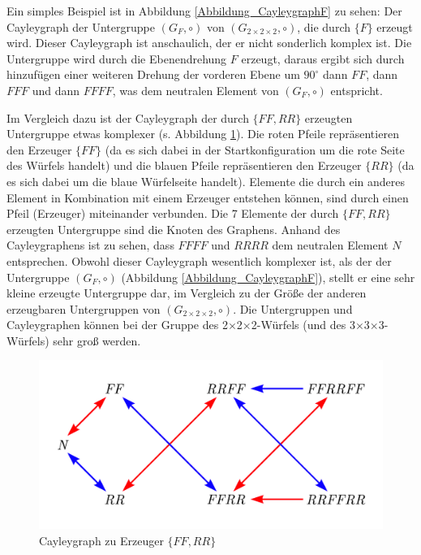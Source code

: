 \documentclass[12pt,a4paper, usenames, dvipsnames]{article}
\theoremstyle{mystyle}
\theoremstyle{definition}
\newcommand{\Gtwo}{\ensuremath{G_{2\times 2\times 2}}}
\newcommand{\Ttwo}{2$\times$2$\times$2-}
\newcommand{\Tthree}{3$\times$3$\times$3-}
\begin{document}
Ein simples Beispiel ist in Abbildung \ref{Abbildung_CayleygraphF} zu sehen: Der Cayleygraph der Untergruppe $(G_F, \circ)$ von $(\Gtwo, \circ)$, die durch $\{ F \}$  erzeugt wird.
Dieser Cayleygraph ist anschaulich, der er nicht sonderlich komplex ist.
Die Untergruppe wird durch die Ebenendrehung $F$ erzeugt, daraus ergibt sich durch hinzufügen einer weiteren Drehung der vorderen Ebene um $90^\circ$ dann $FF$, dann $FFF$ und dann $FFFF$, was dem neutralen Element von $(G_F, \circ)$ entspricht.


Im Vergleich dazu ist der Cayleygraph der durch $\{ FF, RR \}$ erzeugten Untergruppe etwas komplexer (s. Abbildung \ref{Abbildung_CayleygraphFFRR}). 
Die roten Pfeile repräsentieren den Erzeuger $\{FF\}$ (da es sich dabei in der Startkonfiguration um die rote Seite des Würfels handelt) und die blauen Pfeile repräsentieren den Erzeuger $\{RR\}$ (da es sich dabei um die blaue Würfelseite handelt).
Elemente die durch ein anderes Element in Kombination mit einem Erzeuger entstehen können, sind durch einen Pfeil (Erzeuger) miteinander verbunden.
Die 7 Elemente der durch  $\{ FF, RR \}$ erzeugten Untergruppe sind die Knoten des Graphens. 
Anhand des Cayleygraphens ist zu sehen, dass $FFFF$ und $RRRR$ dem neutralen Element $N$ entsprechen.
Obwohl dieser Cayleygraph wesentlich komplexer ist, als der der Untergruppe $(G_F, \circ)$ (Abbildung \ref{Abbildung_CayleygraphF}), stellt er eine sehr kleine erzeugte Untergruppe dar, im Vergleich zu der Größe der anderen erzeugbaren Untergruppen von $(\Gtwo, \circ)$. Die Untergruppen und Cayleygraphen können bei der Gruppe des \Ttwo Würfels (und des \Tthree Würfels) sehr groß werden.

\begin{figure}[H]
\centering
\includegraphics[scale=0.65]{Cayleygraph2.png}
\caption{Cayleygraph zu Erzeuger $\{ FF, RR \}$}
\label{Abbildung_CayleygraphFFRR}
\end{figure}
\end{document}
